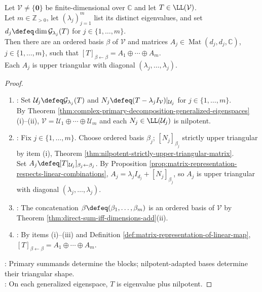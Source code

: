 \begin{theorem} \label{thm:complex-block-diagonal-generalized-eigenbasis} \\
Let $\mathcal{V}\neq\{\mathbf{0}\}$ be finite-dimensional over $\mathbb{C}$ and let $T\in\LL(\mathcal{V})$.\\
Let $m\in\mathbb{Z}_{>0}$, let $(\lambda_j)_{j=1}^{m}$ list its distinct eigenvalues, and set $d_j\defeq\dim\mathcal{G}_{\lambda_j}(T)$ for $j\in\{1,\ldots,m\}$.\\
Then there are an ordered basis $\beta$ of $\mathcal{V}$ and matrices $A_j\in\operatorname{Mat}(d_j,d_j,\mathbb{C})$, $j\in\{1,\ldots,m\}$, such that $[T]_{\beta\leftarrow\beta}=A_1\oplus\cdots\oplus A_m$.\\
Each $A_j$ is upper triangular with diagonal $(\lambda_j,\ldots,\lambda_j)$.
\begin{proof}
\begin{enumerate}[label=(\roman*)]
\setlength{\itemsep}{0pt}
\item {}: Set $\mathcal{U}_j\defeq\mathcal{G}_{\lambda_j}(T)$ and $N_j\defeq(T-\lambda_jI_{\mathcal{V}})|_{\mathcal{U}_j}$ for $j\in\{1,\ldots,m\}$.\\
By Theorem \ref{thm:complex-primary-decomposition-generalized-eigenspaces}(i)--(ii), $\mathcal{V}=\mathcal{U}_1\oplus\cdots\oplus\mathcal{U}_m$ and each $N_j\in\LL(\mathcal{U}_j)$ is nilpotent.
\item {}: Fix $j\in\{1,\ldots,m\}$. Choose ordered basis $\beta_j$; $[N_j]_{\beta_j}$ strictly upper triangular by item (i), Theorem \ref{thm:nilpotent-strictly-upper-triangular-matrix}.\\
Set $A_j\defeq[T|_{\mathcal{U}_j}]_{\beta_j\leftarrow\beta_j}$. By Proposition \ref{prop:matrix-representation-respects-linear-combinations}, $A_j=\lambda_jI_{d_j}+[N_j]_{\beta_j}$, so $A_j$ is upper triangular with diagonal $(\lambda_j,\ldots,\lambda_j)$.
\item {}: The concatenation $\beta\defeq(\beta_1,\ldots,\beta_m)$ is an ordered basis of $\mathcal{V}$ by Theorem \ref{thm:direct-sum-iff-dimensions-add}(ii).
\item {}: By items (i)--(iii) and Definition \ref{def:matrix-representation-of-linear-map}, $[T]_{\beta\leftarrow\beta}=A_1\oplus\cdots\oplus A_m$.
\end{enumerate}
: Primary summands determine the blocks; nilpotent-adapted bases determine their triangular shape.\\
: On each generalized eigenspace, $T$ is eigenvalue plus nilpotent.
\end{proof}
\end{theorem}

